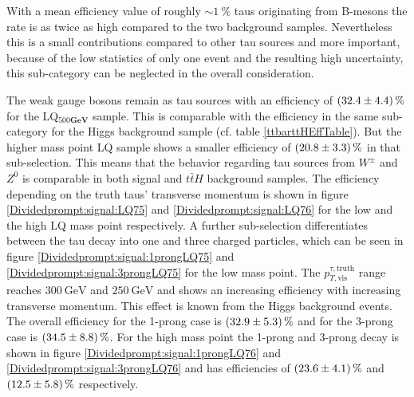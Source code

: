 %
With a mean efficiency value of roughly $\sim\SI{1}{\percent}$ taus originating from B-mesons the rate is as twice as high compared to the two background samples. Nevertheless this is a small contributions compared to other tau sources and more important, because of the low statistics of only one event and the resulting high uncertainty, this sub-category can be neglected in the overall consideration.\par  
The weak gauge bosons remain as tau sources with an efficiency of $\SI{32.4\pm 4.4}{\percent}$ for the LQ$_{500\textbf{GeV}}$ sample. This is comparable with the efficiency in the same sub-category for the Higgs background sample (cf. table \ref{ttbarttHEffTable}). But the higher mass point LQ sample shows a smaller efficiency of $\SI{20.8\pm 3.3}{\percent}$ in that sub-selection. This means that the behavior regarding tau sources from $W^\pm$ and $Z^0$ is comparable in both signal and $t\bar{t}H$ background samples. The efficiency depending on the truth taus' transverse momentum is shown in figure \ref{Dividedprompt:signal:LQ75} and \ref{Dividedprompt:signal:LQ76} for the low and the high LQ mass point respectively. A further sub-selection differentiates between the tau decay into one and three charged particles, which can be seen in figure \ref{Dividedprompt:signal:1prongLQ75} and \ref{Dividedprompt:signal:3prongLQ75} for the low mass point. The $p_{T,\text{vis}}^{\tau,\text{truth}}$ range reaches $\SI{300}{\giga\electronvolt}$ and $\SI{250}{\giga\electronvolt}$ and shows an increasing efficiency with increasing transverse momentum. This effect is known from the Higgs background events. The overall efficiency for the 1-prong case is $\SI{32.9\pm 5.3}{\percent}$ and for the 3-prong case is $\SI{34.5\pm 8.8}{\percent}$. For the high mass point the 1-prong and 3-prong decay is shown in figure \ref{Dividedprompt:signal:1prongLQ76} and \ref{Dividedprompt:signal:3prongLQ76} and has efficiencies of $\SI{23.6\pm 4.1}{\percent}$ and $\SI{12.5\pm 5.8}{\percent}$ respectively.\par 
%
